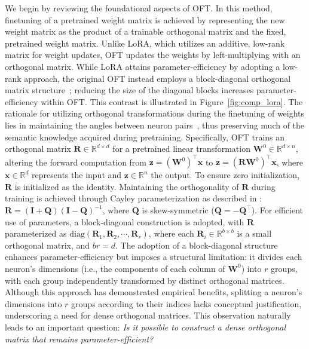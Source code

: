 We begin by reviewing the foundational aspects of OFT. In this method, finetuning of a pretrained weight matrix is achieved by representing the new weight matrix as the product of a trainable orthogonal matrix and the fixed, pretrained weight matrix. Unlike LoRA, which utilizes an additive, low-rank matrix for weight updates, OFT updates the weights by left-multiplying with an orthogonal matrix. While LoRA attains parameter-efficiency by adopting a low-rank approach, the original OFT instead employs a block-diagonal orthogonal matrix structure~\cite{qiu2023controlling}; reducing the size of the diagonal blocks increases parameter-efficiency within OFT. This contrast is illustrated in Figure~\ref{fig:comp_lora}. The rationale for utilizing orthogonal transformations during the finetuning of weights lies in maintaining the angles between neuron pairs~\cite{liu2018learning,liu2021orthogonal,qiu2023controlling}, thus preserving much of the semantic knowledge acquired during pretraining. Specifically, OFT trains an orthogonal matrix $\bm{R}\in\mathbb{R}^{d\times d}$ for a pretrained linear transformation $\bm{W}^0\in\mathbb{R}^{d\times n}$, altering the forward computation from $\bm{z}=(\bm{W}^0)^\top\bm{x}$ to $\bm{z}=(\bm{R}\bm{W}^0)^\top\bm{x}$, where $\bm{x}\in\mathbb{R}^{d}$ represents the input and $\bm{z}\in\mathbb{R}^{n}$ the output. To ensure zero initialization, $\bm{R}$ is initialized as the identity. Maintaining the orthogonality of $\bm{R}$ during training is achieved through Cayley parameterization as described in \cite{qiu2023controlling,liu2021orthogonal}: $\bm{R}=(\bm{I}+\bm{Q})(\bm{I}-\bm{Q})^{-1}$, where $\bm{Q}$ is skew-symmetric ($\bm{Q}=-\bm{Q}^\top$). For efficient use of parameters, a block-diagonal construction is adopted, with $\bm{R}$ parameterized as $\text{diag}(\bm{R}_1,\bm{R}_2,\cdots,\bm{R}_r)$, where each $\bm{R}_i\in\mathbb{R}^{b\times b}$ is a small orthogonal matrix, and $br=d$. The adoption of a block-diagonal structure enhances parameter-efficiency but imposes a structural limitation: it divides each neuron's dimensions (i.e., the components of each column of $\bm{W}^0$) into $r$ groups, with each group independently transformed by distinct orthogonal matrices. Although this approach has demonstrated empirical benefits, splitting a neuron's dimensions into $r$ groups according to their indices lacks conceptual justification, underscoring a need for dense orthogonal matrices. This observation naturally leads to an important question: \emph{Is it possible to construct a dense orthogonal matrix that remains parameter-efficient?}


